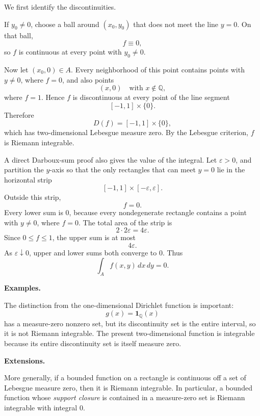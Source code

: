 \begin{solution}

We first identify the discontinuities.

If \(y_0\ne0\), choose a ball around \((x_0,y_0)\) that does not meet the
line \(y=0\). On that ball,
\[
f\equiv0,
\]
so \(f\) is continuous at every point with \(y_0\ne0\).

Now let \((x_0,0)\in A\). Every neighborhood of this point contains points
with \(y\ne0\), where \(f=0\), and also points
\[
(x,0)
\quad\text{with }x\notin\mathbb Q,
\]
where \(f=1\). Hence \(f\) is discontinuous at every point of the line
segment
\[
[-1,1]\times\{0\}.
\]
Therefore
\[
D(f)
=
[-1,1]\times\{0\},
\]
which has two-dimensional Lebesgue measure zero. By the Lebesgue criterion,
\(f\) is Riemann integrable.

A direct Darboux-sum proof also gives the value of the integral. Let
\(\varepsilon>0\), and partition the \(y\)-axis so that the only rectangles
that can meet \(y=0\) lie in the horizontal strip
\[
[-1,1]\times[-\varepsilon,\varepsilon].
\]
Outside this strip,
\[
f=0.
\]
Every lower sum is \(0\), because every nondegenerate rectangle contains a
point with \(y\ne0\), where \(f=0\). The total area of the strip is
\[
2\cdot 2\varepsilon
=
4\varepsilon.
\]
Since \(0\le f\le1\), the upper sum is at most
\[
4\varepsilon.
\]
As \(\varepsilon\downarrow0\), upper and lower sums both converge to \(0\).
Thus
\[
\boxed{
\int_A f(x,y)\,dx\,dy=0.}
\]

\medskip
\noindent\textbf{Examples.}

The distinction from the one-dimensional Dirichlet function is important:
\[
g(x)=\mathbf1_{\mathbb Q}(x)
\]
has a measure-zero nonzero set, but its discontinuity set is the entire
interval, so it is not Riemann integrable. The present two-dimensional
function is integrable because its entire discontinuity set is itself
measure zero.

\medskip
\noindent\textbf{Extensions.}

More generally, if a bounded function on a rectangle is continuous off a
set of Lebesgue measure zero, then it is Riemann integrable. In particular,
a bounded function whose \emph{support closure} is contained in a
measure-zero set is Riemann integrable with integral \(0\).
\end{solution}

